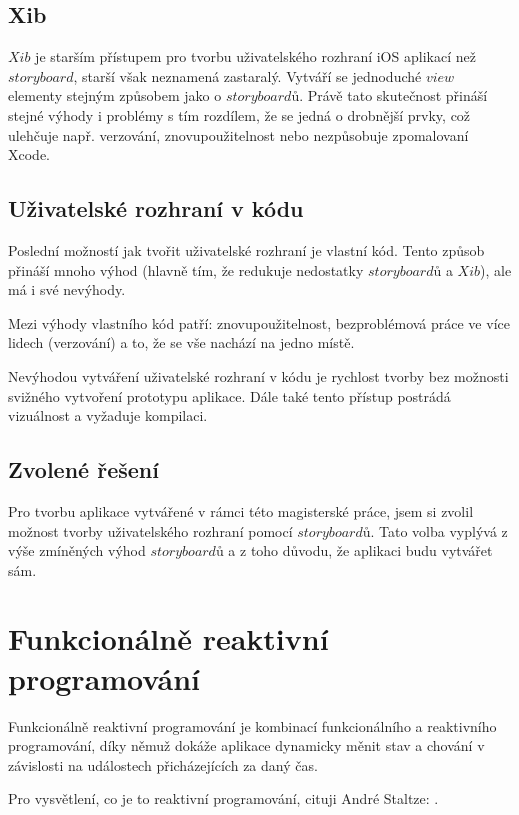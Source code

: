 \documentclass[thesis=M,czech]{FITthesis}[2012/06/26]
\begin{document}
\subsection{Xib}
$Xib$ je starším přístupem pro tvorbu uživatelského rozhraní iOS aplikací než $storyboard$, starší však neznamená zastaralý. Vytváří se jednoduché $view$ elementy stejným způsobem jako o $storyboardů$. Právě tato skutečnost přináší stejné výhody i problémy s tím rozdílem, že se jedná o drobnější prvky, což ulehčuje např. verzování, znovupoužitelnost nebo nezpůsobuje zpomalovaní Xcode. \cite{iOSUI} \cite{dominik}

\subsection{Uživatelské rozhraní v kódu}
Poslední možností jak tvořit uživatelské rozhraní je vlastní kód. Tento způsob přináší mnoho výhod (hlavně tím, že redukuje nedostatky $storyboardů$ a $Xib$), ale má i své nevýhody.

Mezi výhody vlastního kód patří: znovupoužitelnost, bezproblémová práce ve více lidech (verzování) a to, že se vše nachází na jedno místě. 

Nevýhodou vytváření uživatelské rozhraní v kódu je rychlost tvorby bez možnosti svižného vytvoření prototypu aplikace. Dále také tento přístup postrádá vizuálnost a vyžaduje kompilaci. \cite{iOSUI} \cite{dominik}

\subsection{Zvolené řešení}
Pro tvorbu aplikace vytvářené v rámci této magisterské práce, jsem si zvolil možnost tvorby uživatelského rozhraní pomocí $storyboardů$. Tato volba vyplývá z výše zmíněných výhod $storyboardů$ a z toho důvodu, že aplikaci budu vytvářet sám.

\section{Funkcionálně reaktivní programování}
Funkcionálně reaktivní programování je kombinací funkcionálního a reaktivního programování, díky němuž dokáže aplikace dynamicky měnit stav a chování v závislosti na událostech přicházejících za daný čas. \cite{nayebi2016swift}

Pro vysvětlení, co je to reaktivní programování, cituji André Staltze: . \cite{Ztaltz2014}
\end{document}
